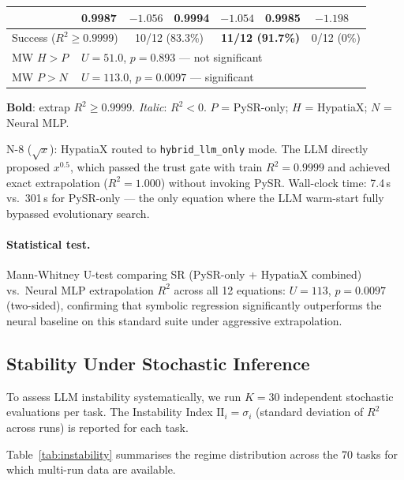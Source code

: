 \documentclass[twoside,11pt]{article}
\newcommand{\Rsq}{R^{2}}
\newcommand{\II}{\mathrm{II}}
\begin{document}
\begin{table}[h]
\begin{tabular}{llrrrrrr}
  & 0.9987 & $-1.056$
  & 0.9994 & $-1.054$
  & 0.9985 & $-1.198$ \\
\midrule
\multicolumn{2}{l}{Success ($\Rsq\ge0.9999$)}
  & \multicolumn{2}{c}{10/12 (83.3\%)}
  & \multicolumn{2}{c}{\textbf{11/12 (91.7\%)}}
  & \multicolumn{2}{c}{0/12 (0\%)} \\
MW $H>P$   & \multicolumn{7}{l}{$U=51.0$, $p=0.893$ — not significant} \\
MW $P>N$   & \multicolumn{7}{l}{$U=113.0$, $p=0.0097$ — significant} \\
\bottomrule
\end{tabular}
\begin{tablenotes}\small
  \item \textbf{Bold}: extrap $\Rsq \ge 0.9999$. \emph{Italic}: $\Rsq < 0$.
    $P$ = PySR-only; $H$ = HypatiaX; $N$ = Neural MLP.
  \item[$\dag$] N-8 ($\sqrt{x}$): HypatiaX routed to \texttt{hybrid\_llm\_only} mode.
    The LLM directly proposed $x^{0.5}$, which passed the trust gate with
    train $\Rsq = 0.9999$ and achieved exact extrapolation ($\Rsq = 1.000$)
    without invoking PySR. Wall-clock time: 7.4\,s vs.\ 301\,s for PySR-only ---
    the only equation where the LLM warm-start fully bypassed evolutionary search.
\end{tablenotes}
\end{table}

\paragraph{Statistical test.}
Mann-Whitney U-test comparing SR (PySR-only + HypatiaX combined) vs.\ Neural MLP
extrapolation $\Rsq$ across all 12 equations: $U=113$, $p=0.0097$ (two-sided),
confirming that symbolic regression significantly outperforms the neural baseline
on this standard suite under aggressive extrapolation.

\subsection{Stability Under Stochastic Inference}
\label{sec:instability_results}

To assess LLM instability systematically, we run $K=30$ independent stochastic
evaluations per task.  The Instability Index $\II_i = \sigma_i$ (standard deviation
of $\Rsq$ across runs) is reported for each task.

Table~\ref{tab:instability} summarises the regime distribution across the 70 tasks
for which multi-run data are available.
\end{document}
